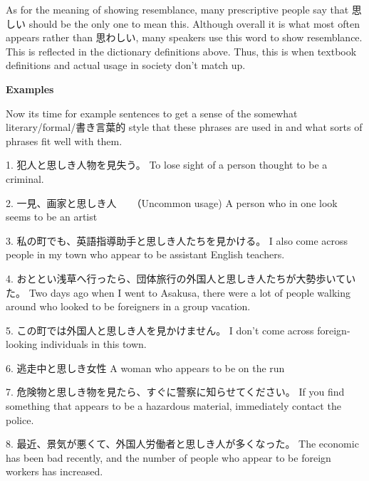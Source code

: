 \par{ As for the meaning of showing resemblance, many prescriptive people say that 思しい should be the only one to mean this. Although overall it is what most often appears rather than 思わしい, many speakers use this word to show resemblance. This is reflected in the dictionary definitions above. Thus, this is when textbook definitions and actual usage in society don't match up. }

\begin{center}
\textbf{Examples }
\end{center}

\par{ Now it\textquotesingle s time for example sentences to get a sense of the somewhat literary\slash formal\slash 書き言葉的 style that these phrases are used in and what sorts of phrases fit well with them.  }

\par{1. 犯人と思しき人物を見失う。 \hfill\break
To lose sight of a person thought to be a criminal. }

\par{2. 一見、画家と思しき人　　（Uncommon usage) \hfill\break
A person who in one look seems to be an artist }

\par{3. 私の町でも、英語指導助手と思しき人たちを見かける。 \hfill\break
I also come across people in my town who appear to be assistant English teachers. }

\par{4. おととい浅草へ行ったら、団体旅行の外国人と思しき人たちが大勢歩いていた。 \hfill\break
Two days ago when I went to Asakusa, there were a lot of people walking around who looked to be foreigners in a group vacation. }

\par{5. この町では外国人と思しき人を見かけません。 \hfill\break
I don't come across foreign-looking individuals in this town. }

\par{6. 逃走中と思しき女性 \hfill\break
A woman who appears to be on the run }

\par{7. 危険物と思しき物を見たら、すぐに警察に知らせてください。 \hfill\break
If you find something that appears to be a hazardous material, immediately contact the police. }

\par{8. 最近、景気が悪くて、外国人労働者と思しき人が多くなった。 \hfill\break
The economic has been bad recently, and the number of people who appear to be foreign workers has increased. }

